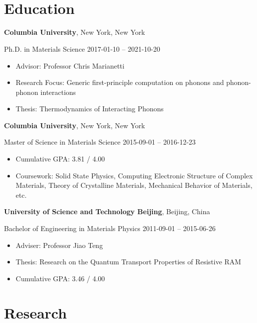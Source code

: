 \documentclass[
  a4paper,
  12pt
]{article}
\author{Lyuwen Fu}
\makeatletter
\gdef\@contacts{}
\renewcommand{\maketitle}{
    \begin{center}
    \textbf{\huge\@author}\\
    \vspace*{0.5\baselineskip}
    \@contacts\\
    \end{center}
}
\newcommand{\LongMonth}[1]{%
\ifcase#1\relax
\or January%
\or February%
\or March%
\or April%
\or May%
\or June%
\or July%
\or August%
\or September%
\or October%
\or November%
\or December%
\fi}
\newcommand{\ShortMonth}[1]{%
\ifcase#1\relax
\or Jan%
\or Feb%
\or Mar%
\or Apr%
\or May%
\or Jun%
\or Jul%
\or Aug%
\or Sep%
\or Oct%
\or Nov%
\or Dec%
\fi}
\newcommand{\DatestampYMD}[3]{\mbox{#1-#2-#3}}
\newcommand{\DatestampYMD}[3]{\mbox{\ShortMonth{#2} #1}}
\newcommand{\DatestampYMD}[3]{\mbox{\LongMonth{#2} #1}}
\newcommand{\DatestampYMD}[3]{#1}
\makeatother
\begin{document}
\maketitle

\section{Education}

{\textbf{Columbia University}},
New York, New York

Ph.D. in
{Materials Science}
\hfill
\DatestampYMD{2017}{01}{10} --
\DatestampYMD{2021}{10}{20}
\begin{itemize}
\item Advisor: Professor Chris Marianetti
\item Research Focus: Generic first-principle computation on phonons and phonon-phonon interactions
\item Thesis: Thermodynamics of Interacting Phonons
\end{itemize}


{\textbf{Columbia University}},
New York, New York

Master of Science in
{Materials Science}
\hfill
\DatestampYMD{2015}{09}{01} --
\DatestampYMD{2016}{12}{23}
\begin{itemize}
\item Cumulative GPA: 3.81 / 4.00
\item Coursework: Solid State Physics, Computing Electronic Structure of Complex Materials, Theory of Crystalline Materials, Mechanical Behavior of Materials, etc.
\end{itemize}


{\textbf{University of Science and Technology Beijing}},
Beijing, China

Bachelor of Engineering in
{Materials Physics}
\hfill
\DatestampYMD{2011}{09}{01} --
\DatestampYMD{2015}{06}{26}
\begin{itemize}
\item Adviser: Professor Jiao Teng
\item Thesis: Research on the Quantum Transport Properties of Resistive RAM
\item Cumulative GPA: 3.46 / 4.00
\end{itemize}


\section{Research}
\end{document}
